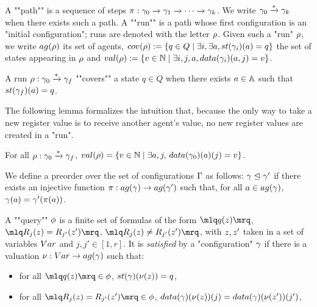 \begin{definition}[Semantics]
	\AP A ""path"" is a sequence of steps $\pi : \gamma_0 \xrightarrow{} \gamma_1 \xrightarrow{} \cdots \xrightarrow{} \gamma_k$. 
	We write $\gamma_0 \xrightarrow{*} \gamma_k$ when there exists such a path.
	A ""run"" is a path whose first configuration is an "initial configuration"; runs are denoted with the letter $\rho$.  
	Given such a "run" $\rho$, we write $\agentsof{\run}$ its set of agents, $\statesin{\run}:= \set{q \in Q \mid \exists i, \exists a, \st{\config_i}(a) = q}$ the set of states appearing in $\rho$ and $\valsof{\run} := \set{\aval \in \nats \mid \exists i,j, a, \data{\config_i}(a,j) = \aval}$.  
	
	\AP A run $\rho: \gamma_0 \xrightarrow{*} \gamma_f$ ""covers"" a state $q \in Q$ when there exists $a \in \mathbb{A}$ such that $\st{\config_f}(a) = q$. 
	
	The following lemma formalizes the intuition that, because the only way to take a new register value is to receive another agent's value, no new register values are created in a "run".
	\begin{lemma}
		\label{lem:run_no_new_register_values}
		For all $\rho: \gamma_0 \xrightarrow{*} \gamma_f$, $\valsof{\run} = \set{\aval \in \nats \mid \exists a, j, \, \data{\config_0}(a)(j) = \aval}$.
	\end{lemma}
	
	\begin{definition}
		We define a preorder over the set of configurations $\Gamma$ as follows: $\gamma \trianglelefteq \gamma'$ if there exists an injective function $\pi: \agentsof{\config} \rightarrow \agentsof{\config'}$ such that, for all $a \in \agentsof{\config}$, $\gamma(a) = \gamma'(\pi(a))$. 
	\end{definition}
	
	\begin{definition}
		A ""query"" $\phi$ is a finite set of formulas of the form $\quotemarks{q(\var{z})}$, $\quotemarks{R_j(\var{z}) = R_{j'}(\var{z}')}$, $\quotemarks{R_j(\var{z}) \neq R_{j'}(\var{z}')}$, with $\var{z}, \var{z}'$ taken in a set of variables $\varset$ and $j,j' \in [1,r]$.
		It is \emph{satisfied} by a "configuration" $\gamma$ if there is a valuation $\nu : \varset \to \agentsof{\config}$ such that:
		\begin{itemize}
			\item for all $\quotemarks{q(\var{z})} \in \query$, $\st{\config}(\nu(\var{z})) = q$,
			
			\item for all $\quotemarks{R_j(\var{z}) = R_{j'}(\var{z'})} \in \query$, $\data{\config}(\nu(\var{z}))(j) = \data{\config}(\nu(\var{z'}))(j')$,
			

\end{itemize}
\end{definition}
\end{definition}
